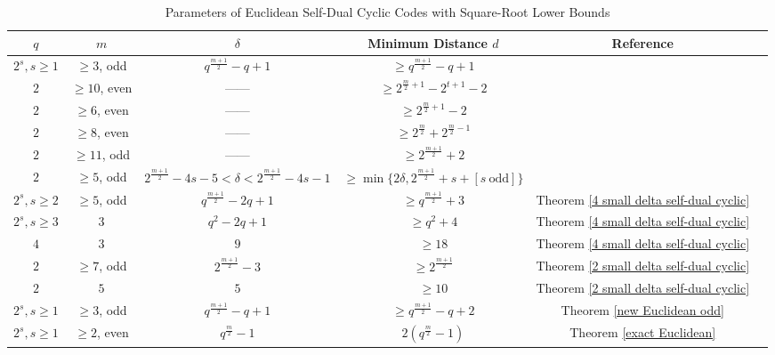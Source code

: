 \documentclass[10pt,a4paper]{amsart}
\begin{document}
\begin{table}[htbp]
    \centering
    \caption{Parameters of Euclidean Self-Dual Cyclic Codes with Square-Root Lower Bounds  }
    \label{Parameters of Euclidean Self-Dual Cyclic Codes}
    \begin{tabular}{c c c c c c}
        \hline
        $q$ & $m$ & $\delta$ & Minimum Distance $d$ & Reference \\
        \hline
        $2^s,s\ge1$ & $\ge3$, odd & $q^\frac{m+1}{2}-q+1$ & $\ge q^\frac{m+1}{2}-q+1$ & \cite{10856234} \\
        $2$ & $\ge 10$, even & —— & $\ge 2^{\frac{m}{2}+1}-2^{t+1}-2$ & \cite{wang2026constructionsselfdualbinarycyclic}\\
        $2$ & $\ge 6$, even & —— & $\ge 2^{\frac{m}{2}+1}-2$ & \cite{wang2026constructionsselfdualbinarycyclic} \\
        $2$ & $\ge 8$, even & —— & $\ge 2^\frac{m}{2}+2^{\frac{m}{2}-1}$ & \cite{wang2026constructionsselfdualbinarycyclic} \\ 
        $2$ & $\ge 11$, odd & —— & $\ge 2^{\frac{m+1}{2}}+2$ & \cite{wang2026constructionsselfdualbinarycyclic} \\        
        $2$ & $\ge5$, odd & $2^\frac{m+1}{2}-4s-5<\delta<2^\frac{m+1}{2}-4s-1$ & $\ge \min\{2\delta,2^\frac{m+1}{2}+s+[s~\text{odd}]\}$ & \cite{wang2026constructionsselfdualbinarycyclic} \\
        $2^s,s\ge 2$ & $\ge 5$, odd & $q^\frac{m+1}{2}-2q+1$ & $\ge q^\frac{m+1}{2}+3$  & Theorem \ref{4 small delta self-dual cyclic} \\
        $2^s, s\ge 3$ & $3$ & $q^2-2q+1$ & $\ge q^2+4$  & Theorem \ref{4 small delta self-dual cyclic} \\
        $4$ & $3$ & $9$ & $\ge 18$ & Theorem \ref{4 small delta self-dual cyclic} \\
        $2$ & $\ge 7$, odd  & $2^\frac{m+1}{2}-3$ & $\ge 2^\frac{m+1}{2}$ & Theorem \ref{2 small delta self-dual cyclic} \\
        $2$ & $5$ & $5$ & $\ge 10$ & Theorem \ref{2 small delta self-dual cyclic} \\
        $2^s,s\ge1$ & $\ge3$, odd & $q^\frac{m+1}{2}-q+1$ & $\ge q^\frac{m+1}{2}-q+2$ & Theorem \ref{new Euclidean odd} \\
        $2^s,s\ge1$ & $\ge 2$, even & $q^\frac{m}{2}-1$ & $2(q^\frac{m}{2}-1)$ & Theorem \ref{exact Euclidean} \\
        \hline
    \end{tabular}
\end{table}
\end{document}
